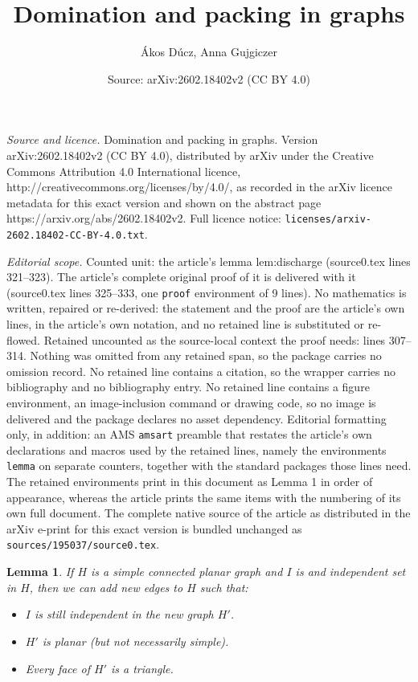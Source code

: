 \documentclass[10pt,a4paper]{amsart}
\title{Domination and packing in graphs}
\author{\'Akos D\'ucz, Anna Gujgiczer}
\date{Source: arXiv:2602.18402v2 (CC BY 4.0)}
\newtheorem{lemma}{Lemma}
\begin{document}
\maketitle

\noindent\emph{Source and licence.} Domination and packing in graphs. Version arXiv:2602.18402v2 (CC BY 4.0), distributed by arXiv under the Creative Commons Attribution 4.0 International licence, http://creativecommons.org/licenses/by/4.0/, as recorded in the arXiv licence metadata for this exact version and shown on the abstract page https://arxiv.org/abs/2602.18402v2. Full licence notice: \texttt{licenses/arxiv-2602.18402-CC-BY-4.0.txt}.\par\smallskip

\noindent\textit{Editorial scope.} Counted unit: the article's lemma lem:discharge (source0.tex lines 321--323). The article's complete original proof of it is delivered with it (source0.tex lines 325--333, one \texttt{proof} environment of 9 lines). No mathematics is written, repaired or re-derived: the statement and the proof are the article's own lines, in the article's own notation, and no retained line is substituted or re-flowed.  Retained uncounted as the source-local context the proof needs: lines 307--314.  Nothing was omitted from any retained span, so the package carries no omission record.  No retained line contains a citation, so the wrapper carries no bibliography and no bibliography entry.  No retained line contains a figure environment, an image-inclusion command or drawing code, so no image is delivered and the package declares no asset dependency.  Editorial formatting only, in addition: an AMS \texttt{amsart} preamble that restates the article's own declarations and macros used by the retained lines, namely the environments \texttt{lemma} on separate counters, together with the standard packages those lines need.  The retained environments print in this document as Lemma 1 in order of appearance, whereas the article prints the same items with the numbering of its own full document.  The complete native source of the article as distributed in the arXiv e-print for this exact version is bundled unchanged as \texttt{sources/195037/source0.tex}.
\begin{lemma}\label{lem:triangulate}
    If $H$ is a simple connected planar graph and $I$ is and independent set in $H$, then we can add new edges to $H$ such that:
    \begin{itemize}
        \item $I$ is still independent in the new graph $H'$.
        \item $H'$ is planar (but not necessarily simple).
        \item Every face of $H'$ is a triangle.
    \end{itemize}
\end{lemma}
\end{document}
